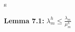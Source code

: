 s\documentclass[../../main.tex]{subfiles}
\begin{document}
\begin{comment}
\textbf{Proof:} The minmax principle gives $\lambda_{m}^{h} \leq \max\left\{R(v) \ | \ v \in S_{m} \right\}$ since $\dim S_{m} = m$.\\

Now we take an arbitrary $v \in S_{m}$, $v \neq 0$. Then there exists a $u \in E_{m}$ such that $Py = v$. Since $u \in E_{m}$, we have that $\frac{1}{||u||}u \in B_{m}$ and

\begin{eqnarray*}
R(\frac{1}{||u||}u) &=& \frac{b\left(\frac{1}{||u||}u,\frac{1}{||u||}u\right)}{\left(\frac{1}{||u||}u,\frac{1}{||u||}u\right)}\\
					&=& \frac{b(u,u)}{(u,u)}\\
					&=& R(u)
\end{eqnarray*}
So then we have that
\begin{eqnarray*}
\lambda_{m}^{h} &\leq & \max\left\{R(v) \ | \ v \in S_{m} \right\}\\
					&=& \max\left\{R(Pu) \ | \ u \in E_{m} \right\}\\
					&=& \max\left\{R(Pu) \ | \ u \in B_{m} \right\}
\end{eqnarray*}\qed
\end{comment}

\textbf{Lemma 7.1:} $\lambda_{m}^{h} \leq \frac{\lambda_{m}}{\mu_{m}^{h}}$\\
\end{document}
